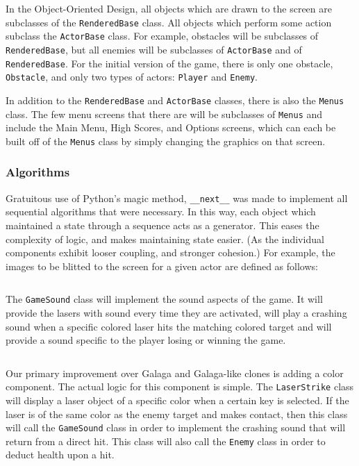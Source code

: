 In the Object-Oriented Design, all objects which are drawn to the screen
are subclasses of the \texttt{RenderedBase} class.  All
objects which perform some action subclass the \texttt{ActorBase}
class.  For example, obstacles will be subclasses of
\texttt{RenderedBase}, but all enemies will be subclasses of
\texttt{ActorBase} and of \texttt{RenderedBase}.
For the initial version of the game, there is only one obstacle,
\texttt{Obstacle}, and only two types of actors:
\texttt{Player} and \texttt{Enemy}.


In addition to the \texttt{RenderedBase} and
\texttt{ActorBase} classes, there is also the
\texttt{Menus} class. The few menu screens that there are
will be subclasses of \texttt{Menus} and include the Main
Menu, High Scores, and Options screens, which can each be built off of
the \texttt{Menus} class by simply changing the graphics
on that screen.

\subsubsection*{Algorithms}

Gratuitous use of Python's magic method, \texttt{__next__}
was made to implement all sequential algorithms that were necessary.
In this way, each object which maintained a state through a sequence
acts as a generator.  This eases the complexity of logic, and makes
maintaining state easier. (As the individual components exhibit looser
coupling, and stronger cohesion.)  For example, the images to be blitted
to the screen for a given actor are defined as follows:

\inputminted[baselinestretch=1]{python}{../code/RenderedBase.py}

The \texttt{GameSound} class will implement the sound
aspects of the game.  It will provide the lasers with sound every
time they are activated, will play a crashing sound when a specific
colored laser hits the matching colored target and will provide a
sound specific to the player losing or winning the game.

\inputminted[baselinestretch=1]{python}{../code/GameSound.py}

Our primary improvement over Galaga and Galaga-like clones is
adding a color component.  The actual logic for this component
is simple.  The \texttt{LaserStrike} class will display a
laser object of a specific color when a certain key is selected. If
the laser is of the same color as the enemy target and makes contact,
then this class will call the \texttt{GameSound} class
in order to implement the crashing sound that will return from a
direct hit. This class will also call the \texttt{Enemy}
class in order to deduct health upon a hit.

